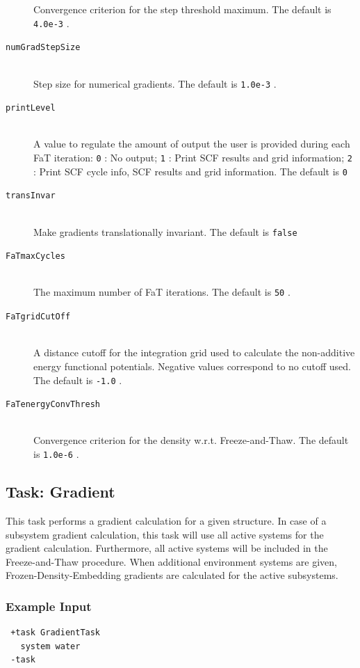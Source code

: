 \documentclass[bibliography=totocnumbered,a4paper,10pt,oneside]{scrbook}
\newcommand{\ttt}[1]{%
  \begingroup\setlength{\fboxsep}{1pt}%
  \colorbox{serenity-green!30}{\texttt{\hspace*{2pt}\vphantom{(g}#1\hspace*{2pt}}}%
  \endgroup
}
\begin{document}
\begin{description}
  Convergence criterion for the step threshold maximum. The default is \ttt{4.0e-3}. 
 \item [\texttt{numGradStepSize}]\hfill \\
  Step size for numerical gradients. The default is \ttt{1.0e-3}. 
 \item [\texttt{printLevel}]\hfill \\
  A value to regulate the amount of output the user is provided during each FaT iteration:
  \ttt{0}: No output; \ttt{1}: Print SCF results and grid information; \ttt{2}: Print SCF cycle info, SCF results and grid information. The default is \ttt{0}
 \item [\texttt{transInvar}]\hfill \\
    Make gradients translationally invariant. The default is \ttt{false}
 \item [\texttt{FaTmaxCycles}]\hfill \\
   The maximum number of FaT iterations. The default is \ttt{50}.
 \item [\texttt{FaTgridCutOff}]\hfill \\
  A distance cutoff for the integration grid used to calculate the non-additive energy functional potentials. Negative values correspond to no cutoff used. The default is \ttt{-1.0}.
 \item [\texttt{FaTenergyConvThresh}]\hfill \\
 Convergence criterion for the density w.r.t. Freeze-and-Thaw. The default is \ttt{1.0e-6}.
\end{description}


\subsection{Task: Gradient}
This task performs a gradient calculation for a given structure. In case of a subsystem gradient calculation, this task will use all active systems for the gradient calculation. Furthermore, all active systems will be included in the Freeze-and-Thaw procedure. When additional environment systems are given, Frozen-Density-Embedding gradients are calculated for the active subsystems.
\subsubsection{Example Input}
\begin{lstlisting}
 +task GradientTask
   system water
 -task
\end{lstlisting}
\end{document}

